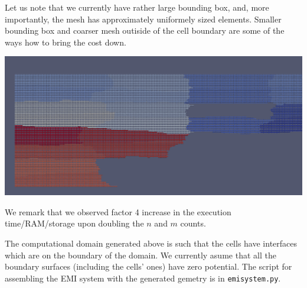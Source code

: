 \documentclass[11pt,a4paper]{article}
\begin{document}
Let us note that we currently have rather large bounding box, and, more importantly,
the mesh has approximately uniformely sized elements. Smaller bounding box and
coarser mesh outiside of the cell boundary are some of the ways how to bring
the cost down.

\begin{center}
\includegraphics[width=\textwidth]{piece.png}
\end{center}

We remark that we observed factor 4 increase in the execution time/RAM/storage upon doubling 
the $n$ and $m$ counts. 

The computational domain generated above is such that the cells have interfaces which are on 
the boundary of the domain. We currently asume that all the boundary surfaces (including the cells' 
ones) have zero potential. The script for assembling the EMI system with the generated gemetry is
in \texttt{emi\textunderscore system.py}.


\end{document}
